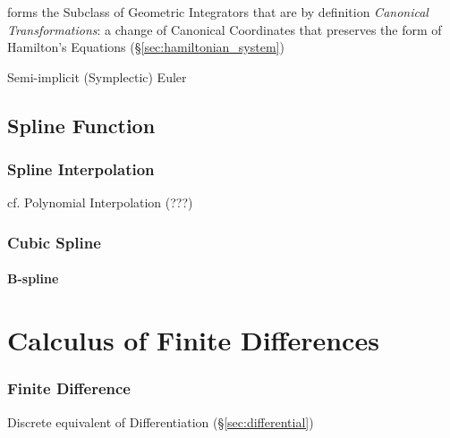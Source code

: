 forms the Subclass of Geometric Integrators that are by definition
\emph{Canonical Transformations}: a change of Canonical Coordinates that
preserves the form of Hamilton's Equations (\S\ref{sec:hamiltonian_system})

Semi-implicit (Symplectic) Euler



\subsection{Spline Function}\label{sec:spline}

\subsubsection{Spline Interpolation}\label{sec:spline_interpolation}

cf. Polynomial Interpolation (???) %



\subsubsection{Cubic Spline}\label{sec:cubic_spline}

\paragraph{B-spline}\label{sec:b_spline}\hfill



\section{Calculus of Finite Differences}\label{sec:finite_differences_calculus}


\subsubsection{Finite Difference}\label{sec:finite_difference}

Discrete equivalent of Differentiation (\S\ref{sec:differential})



